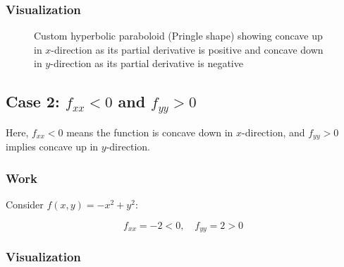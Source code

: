 \documentclass{article}
\begin{document}
\subsubsection*{Visualization}

\begin{figure}[h]
\centering
{}
\caption{Custom hyperbolic paraboloid (Pringle shape) showing concave up in \( x \)-direction as its partial derivative is positive and concave down in \( y \)-direction as its partial derivative is negative}
\label{fig:custom_pringle_long_axes}
\end{figure}

\subsection{Case 2: \( f_{xx} < 0 \) and \( f_{yy} > 0 \)}

Here, \( f_{xx} < 0 \) means the function is concave down in \( x \)-direction, and \( f_{yy} > 0 \) implies concave up in \( y \)-direction.

\subsubsection*{Work}

Consider \( f(x, y) = -x^2 + y^2 \):

\[
f_{xx} = -2 < 0, \quad f_{yy} = 2 > 0
\]

\subsubsection*{Visualization}
\end{document}
